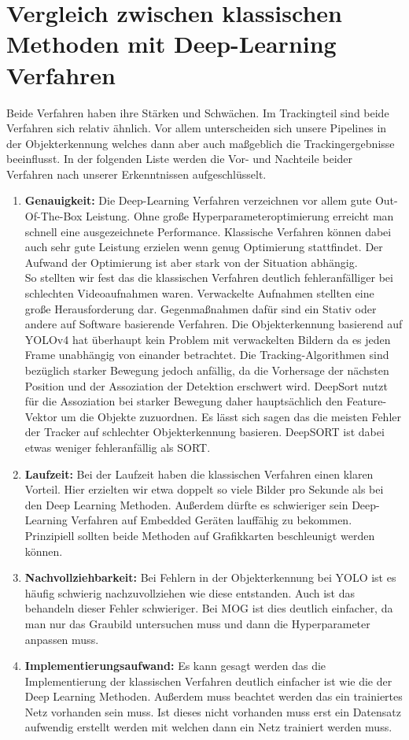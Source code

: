 \documentclass[conference]{IEEEtran}
\begin{document}
	\section{Vergleich zwischen klassischen Methoden mit Deep-Learning Verfahren}
	Beide Verfahren haben ihre Stärken und Schwächen. Im Trackingteil sind beide Verfahren sich relativ ähnlich. Vor allem unterscheiden sich unsere Pipelines in der Objekterkennung welches dann aber auch maßgeblich die Trackingergebnisse beeinflusst. In der folgenden Liste werden die Vor- und Nachteile beider Verfahren nach unserer Erkenntnissen aufgeschlüsselt.
	\begin{enumerate}
		\item \textbf{Genauigkeit:} Die Deep-Learning Verfahren verzeichnen vor allem gute Out-Of-The-Box Leistung. Ohne große Hyperparameteroptimierung erreicht man schnell eine ausgezeichnete Performance. Klassische Verfahren können dabei auch sehr gute Leistung erzielen wenn genug Optimierung stattfindet. Der Aufwand der Optimierung ist aber stark von der Situation abhängig.\\
		So stellten wir fest das die klassischen Verfahren deutlich fehleranfälliger bei schlechten Videoaufnahmen waren. Verwackelte Aufnahmen stellten eine große Herausforderung dar. Gegenmaßnahmen dafür sind ein Stativ oder andere auf Software basierende Verfahren. Die Objekterkennung basierend auf YOLOv4 hat überhaupt kein Problem mit verwackelten Bildern da es jeden Frame unabhängig von einander betrachtet. Die Tracking-Algorithmen sind bezüglich starker Bewegung jedoch anfällig, da die Vorhersage der nächsten Position und der Assoziation der Detektion erschwert wird. DeepSort nutzt für die Assoziation bei starker Bewegung daher hauptsächlich den Feature-Vektor um die Objekte zuzuordnen. Es lässt sich sagen das die meisten Fehler der Tracker auf schlechter Objekterkennung basieren. DeepSORT ist dabei etwas weniger fehleranfällig als SORT.
		
		\item \textbf{Laufzeit:} Bei der Laufzeit haben die klassischen Verfahren einen klaren Vorteil. Hier erzielten wir etwa doppelt so viele Bilder pro Sekunde als bei den Deep Learning Methoden. Außerdem dürfte es schwieriger sein Deep-Learning Verfahren auf Embedded Geräten lauffähig zu bekommen. Prinzipiell sollten beide Methoden auf Grafikkarten beschleunigt werden können.
		
		\item \textbf{Nachvollziehbarkeit:} Bei Fehlern in der Objekterkennung bei YOLO ist es häufig schwierig nachzuvollziehen wie diese entstanden. Auch ist das behandeln dieser Fehler schwieriger. Bei MOG ist dies deutlich einfacher, da man nur das Graubild untersuchen muss und dann die Hyperparameter anpassen muss.
		
		\item \textbf{Implementierungsaufwand:} Es kann gesagt werden das die Implementierung der klassischen Verfahren deutlich einfacher ist wie die der Deep Learning Methoden. Außerdem muss beachtet werden das ein trainiertes Netz vorhanden sein muss. Ist dieses nicht vorhanden muss erst ein Datensatz aufwendig erstellt werden mit welchen dann ein Netz trainiert werden muss.
		
	\end{enumerate}
\end{document}
